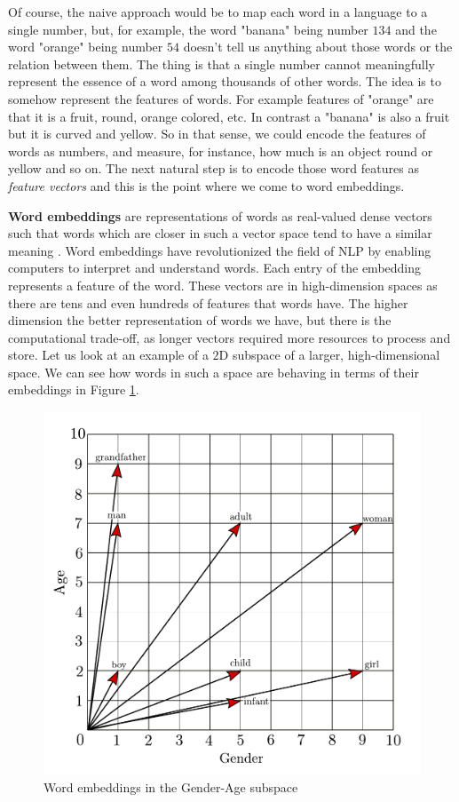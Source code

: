 \documentclass[12pt]{article}
\numberwithin{equation}{section}
\begin{document}
\begin{spacing}{1.5}
	Of course, the naive approach would be to map each word in a language to a single number, but, for example, the word "banana" being number $134$ and the word "orange" being number $54$ doesn't tell us anything about those words or the relation between them. The thing is that a single number cannot meaningfully represent the essence of a word among thousands of other words. The idea is to somehow represent the features of words. For example features of "orange" are that it is a fruit, round, orange colored, etc. In contrast a "banana" is also a fruit but it is curved and yellow. So in that sense, we could encode the features of words as numbers, and measure, for instance, how much is an object round or yellow and so on. The next natural step is to encode those word features as \textit{feature vectors} and this is the point where we come to word embeddings.
	
	\textbf{Word embeddings} are representations of words as real-valued dense vectors such that words which are closer in such a vector space tend to have a similar meaning \cite{word-embedding-survey}. Word embeddings have revolutionized the field of NLP by enabling computers to interpret and understand words. Each entry of the embedding represents a feature of the word. These vectors are in high-dimension spaces as there are tens and even hundreds of features that words have. The higher dimension the better representation of words we have, but there is the computational trade-off, as longer vectors required more resources to process and store. Let us look at an example of a $2$D subspace of a larger, high-dimensional space. We can see how words in such a space are behaving in terms of their embeddings in Figure \ref{subspace_label}.
	\begin{figure}[H]
		\centering
		\hspace*{-1.0cm}
		\includegraphics[scale=0.75]{subspace}		
		\caption{Word embeddings in the Gender-Age subspace}
		\label{subspace_label}
	\end{figure}
	

\end{spacing}
\end{document}
